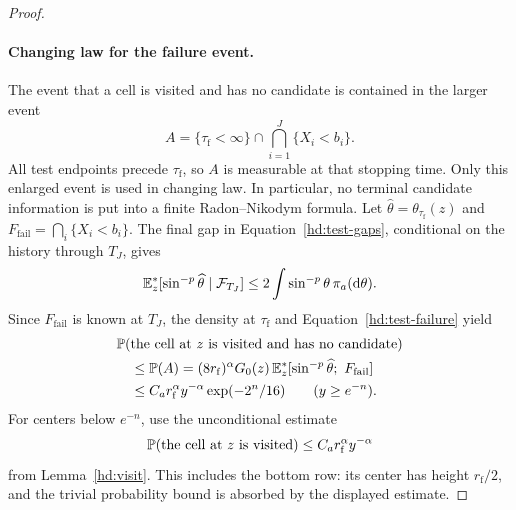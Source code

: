 \begin{proof}
\paragraph{Changing law for the failure event.}
The event that a cell is visited and has no candidate is
contained in the larger event
\begin{equation}
 A=\{\tau_{\mathrm f}<\infty\}
       \cap\bigcap_{i=1}^J\{X_i<b_i\}.
 \label{hd:adapted-enlargement}
\end{equation}
All test endpoints precede \(\tau_{\mathrm f}\), so \(A\) is
measurable at that stopping time. Only this enlarged event is
used in changing law. In particular, no terminal candidate
information is put into a finite Radon--Nikodym formula.
Let \(\widehat\theta=\theta_{\tau_{\mathrm f}}(z)\) and
\(F_{\mathrm{fail}}=\bigcap_i\{X_i<b_i\}\).
The final gap in Equation~\eqref{hd:test-gaps}, conditional on
the history through \(T_J\), gives
\[
 \mathbb E_z^*[\sin^{-p}\widehat\theta\mid\mathcal F_{T_J}]
 \le 2\int\sin^{-p}\theta\,\pi_a(\mathop{}\!\mathrm{d}\theta).
\]
Since \(F_{\mathrm{fail}}\) is known at \(T_J\), the density at
\(\tau_{\mathrm f}\) and Equation~\eqref{hd:test-failure} yield
\begin{align}
 &\mathbb P(\text{the cell at }z\text{ is visited and has no candidate})
 \notag\\
 &\quad\le\mathbb P(A)
  =(8r_{\mathrm f})^\alpha G_0(z)\,
       \mathbb E_z^*[\sin^{-p}\widehat\theta;\ F_{\mathrm{fail}}]
 \notag\\
 &\quad\le C_a r_{\mathrm f}^{\alpha}y^{-\alpha}
                       \exp(-2^n/16)
       \qquad(y\ge e^{-n}).
 \label{hd:upper-cell}
\end{align}
For centers below \(e^{-n}\), use the unconditional estimate
\begin{equation}
 \mathbb P(\text{the cell at }z\text{ is visited})
 \le C_a r_{\mathrm f}^{\alpha}y^{-\alpha}
 \label{hd:lower-cell}
\end{equation}
from Lemma~\ref{hd:visit}. This includes the bottom row:
its center has height \(r_{\mathrm f}/2\), and the trivial
probability bound is absorbed by the displayed estimate.


\end{proof}
